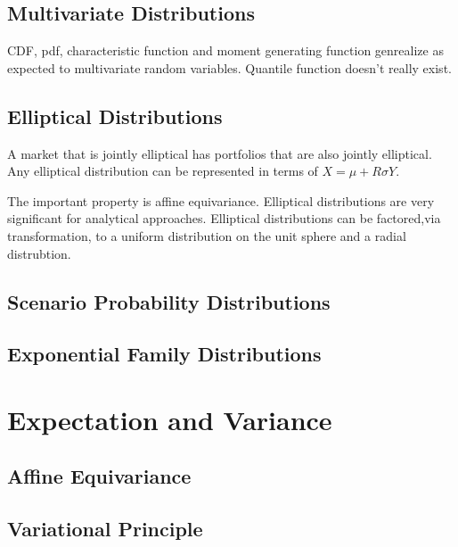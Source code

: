\subsection{Multivariate Distributions}
CDF, pdf, characteristic function and moment generating function genrealize as expected to multivariate random variables. Quantile function doesn't really exist. 
 


\subsection{Elliptical Distributions}

A market that is jointly elliptical has portfolios that are also jointly elliptical. Any elliptical distribution can be represented in terms of $X = \mu + R \sigma Y$. 

The important property is affine equivariance. Elliptical distributions are very significant for analytical approaches. Elliptical distributions can be factored,via transformation, to a uniform distribution on the unit sphere and a radial distrubtion.

\subsection{Scenario Probability Distributions}


\subsection{Exponential Family Distributions}



\section{Expectation and Variance}


\subsection{Affine Equivariance}

\subsection{Variational Principle}

